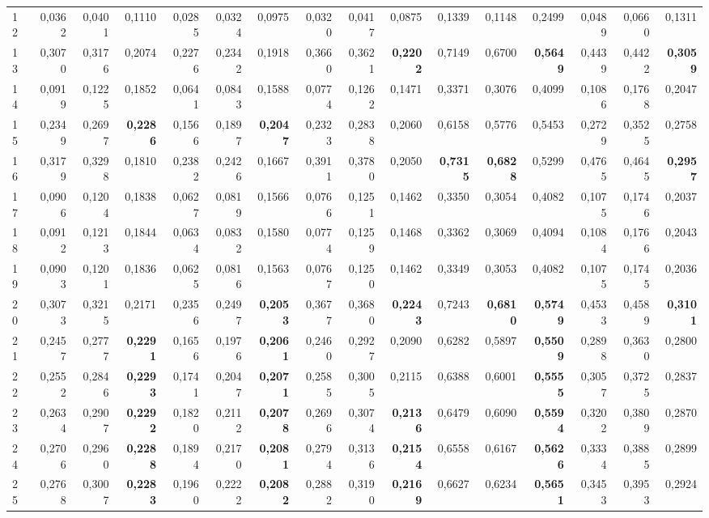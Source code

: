 \begin{table}[htp!]
\begin{adjustwidth}{-2cm}{}
\begin{tabular}{ l | *{15}{| r}}
12	&	0,0362	&	0,0401	&	0,1110	&	0,0285	&	0,0324	&	0,0975	&	0,0320	&	0,0417	&	0,0875	&	0,1339	&	0,1148	&	0,2499	&	0,0489	&	0,0660	&	0,1311	\\
13	&	0,3070	&	0,3176	&	0,2074	&	0,2276	&	0,2342	&	0,1918	&	0,3660	&	0,3621	&	\textbf{0,2202}	&	0,7149	&	0,6700	&	\textbf{0,5649}	&	0,4439	&	0,4422	&	\textbf{0,3059}	\\
14	&	0,0919	&	0,1225	&	0,1852	&	0,0641	&	0,0843	&	0,1588	&	0,0774	&	0,1262	&	0,1471	&	0,3371	&	0,3076	&	0,4099	&	0,1086	&	0,1768	&	0,2047	\\
15	&	0,2349	&	0,2697	&	\textbf{0,2286}	&	0,1566	&	0,1897	&	\textbf{0,2047}	&	0,2323	&	0,2838	&	0,2060	&	0,6158	&	0,5776	&	0,5453	&	0,2729	&	0,3525	&	0,2758	\\
16	&	0,3179	&	0,3298	&	0,1810	&	0,2382	&	0,2426	&	0,1667	&	0,3911	&	0,3780	&	0,2050	&	\textbf{0,7315}	&	\textbf{0,6828}	&	0,5299	&	0,4765	&	0,4645	&	\textbf{0,2957}	\\
17	&	0,0906	&	0,1204	&	0,1838	&	0,0627	&	0,0819	&	0,1566	&	0,0766	&	0,1251	&	0,1462	&	0,3350	&	0,3054	&	0,4082	&	0,1075	&	0,1746	&	0,2037	\\
18	&	0,0912	&	0,1213	&	0,1844	&	0,0634	&	0,0832	&	0,1580	&	0,0774	&	0,1259	&	0,1468	&	0,3362	&	0,3069	&	0,4094	&	0,1084	&	0,1766	&	0,2043	\\
19	&	0,0903	&	0,1201	&	0,1836	&	0,0625	&	0,0816	&	0,1563	&	0,0767	&	0,1250	&	0,1462	&	0,3349	&	0,3053	&	0,4082	&	0,1075	&	0,1745	&	0,2036	\\
20	&	0,3073	&	0,3215	&	0,2171	&	0,2356	&	0,2497	&	\textbf{0,2053}	&	0,3677	&	0,3680	&	\textbf{0,2243}	&	0,7243	&	\textbf{0,6810}	&	\textbf{0,5749}	&	0,4533	&	0,4589	&	\textbf{0,3101}	\\
21	&	0,2457	&	0,2777	&	\textbf{0,2291}	&	0,1656	&	0,1976	&	\textbf{0,2061}	&	0,2460	&	0,2927	&	0,2090	&	0,6282	&	0,5897	&	\textbf{0,5509}	&	0,2898	&	0,3630	&	0,2800	\\
22	&	0,2552	&	0,2846	&	\textbf{0,2293}	&	0,1741	&	0,2047	&	\textbf{0,2071}	&	0,2585	&	0,3005	&	0,2115	&	0,6388	&	0,6001	&	\textbf{0,5555}	&	0,3057	&	0,3725	&	0,2837	\\
23	&	0,2634	&	0,2907	&	\textbf{0,2292}	&	0,1820	&	0,2112	&	\textbf{0,2078}	&	0,2696	&	0,3074	&	\textbf{0,2136}	&	0,6479	&	0,6090	&	\textbf{0,5594}	&	0,3202	&	0,3809	&	0,2870	\\
24	&	0,2706	&	0,2960	&	\textbf{0,2288}	&	0,1894	&	0,2170	&	\textbf{0,2081}	&	0,2794	&	0,3136	&	\textbf{0,2154}	&	0,6558	&	0,6167	&	\textbf{0,5626}	&	0,3334	&	0,3885	&	0,2899	\\
25	&	0,2768	&	0,3007	&	\textbf{0,2283}	&	0,1960	&	0,2222	&	\textbf{0,2082}	&	0,2882	&	0,3190	&	\textbf{0,2169}	&	0,6627	&	0,6234	&	\textbf{0,5651}	&	0,3453	&	0,3953	&	0,2924	\\

\end{tabular}
\end{adjustwidth}
\end{table}
